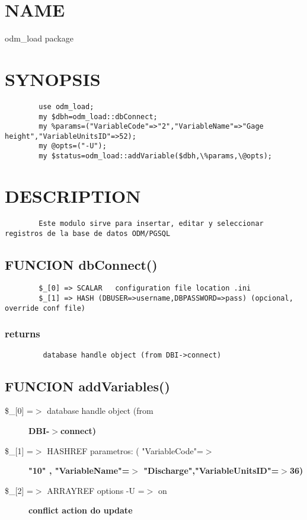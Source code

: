 \documentclass{article}
\begin{document}

\section{NAME\label{NAME}}


odm\_load package

\section{SYNOPSIS\label{SYNOPSIS}}
\begin{verbatim}
        use odm_load;
        my $dbh=odm_load::dbConnect;
        my %params=("VariableCode"=>"2","VariableName"=>"Gage height","VariableUnitsID"=>52);
        my @opts=("-U");
        my $status=odm_load::addVariable($dbh,\%params,\@opts);
\end{verbatim}
\section{DESCRIPTION\label{DESCRIPTION}}
\begin{verbatim}
        Este modulo sirve para insertar, editar y seleccionar registros de la base de datos ODM/PGSQL
\end{verbatim}
\subsection*{FUNCION dbConnect()\label{FUNCION_dbConnect_}}
\begin{verbatim}
        $_[0] => SCALAR   configuration file location .ini 
        $_[1] => HASH (DBUSER=>username,DBPASSWORD=>pass) (opcional, override conf file)
\end{verbatim}
\subsubsection*{returns\label{returns}}
\begin{verbatim}
         database handle object (from DBI->connect)
\end{verbatim}
\subsection*{FUNCION addVariables()\label{FUNCION_addVariables_}}
\begin{description}

\item[{\$\_[0] =$>$ database handle object (from}] \textbf{DBI-$>$connect)}
\item[{\$\_[1] =$>$ HASHREF parametros: ( "VariableCode"=$>$}] \textbf{"10" , "VariableName"=$>$ "Discharge","VariableUnitsID"=$>$36)}
\item[{\$\_[2] =$>$ ARRAYREF options -U =$>$ on}] \textbf{conflict action do update}\end{description}
\end{document}
